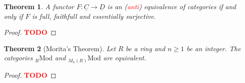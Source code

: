 \documentclass{article}
\theoremstyle{plain}
\newtheorem{theorem}{Theorem}[subsection]
\theoremstyle{definition}
\newcommand{\td}{\textcolor{red}{\textbf{TODO}}}
\begin{document}
\begin{theorem}
    A functor $F : \underline{C} \to \underline{D}$ is an (\textcolor{red}{anti}) equivalence of categories if and only if $F$ is full, faithfull and essentially surjective.
\end{theorem}

\begin{proof}
    \td
\end{proof}

\begin{theorem}[Morita's Theorem]
    Let $R$ be a ring and $n \geq 1$ be an integer. The categories ${}_R\text{Mod}$ and ${}_{M_n(R)}\text{Mod}$ are equivalent.
\end{theorem}

\begin{proof}
    \td
\end{proof}
\end{document}

